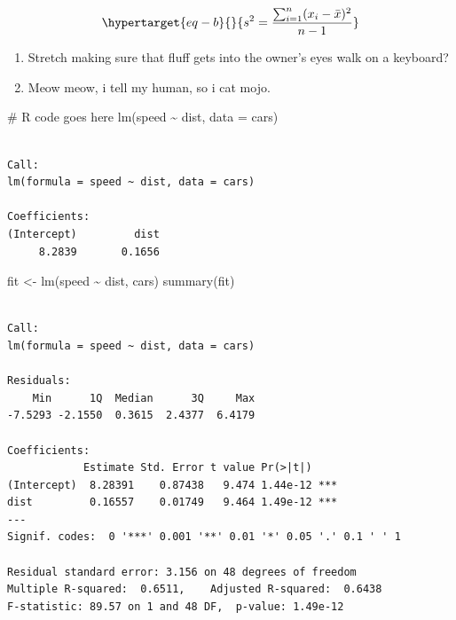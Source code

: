 \documentclass[
  11pt,
  letterpaper,
  DIV=11,
  numbers=noendperiod]{scrartcl}
\newenvironment{Shaded}{\begin{snugshade}}{\end{snugshade}}
\newcommand{\AttributeTok}[1]{\textcolor[rgb]{0.40,0.45,0.13}{#1}}
\newcommand{\CommentTok}[1]{\textcolor[rgb]{0.37,0.37,0.37}{#1}}
\newcommand{\FunctionTok}[1]{\textcolor[rgb]{0.28,0.35,0.67}{#1}}
\newcommand{\NormalTok}[1]{\textcolor[rgb]{0.00,0.23,0.31}{#1}}
\newcommand{\OtherTok}[1]{\textcolor[rgb]{0.00,0.23,0.31}{#1}}
\newcommand{\SpecialCharTok}[1]{\textcolor[rgb]{0.37,0.37,0.37}{#1}}
\providecommand{\tightlist}{%
  \setlength{\itemsep}{0pt}\setlength{\parskip}{0pt}}\usepackage{longtable,booktabs,array}
\begin{document}
\begin{equation}\protect\hypertarget{eq-b}{}{ s^2 = \frac{\sum_{i=1}^n (x_i - \bar{x})^2}{n-1} }\label{eq-b}\end{equation}

\begin{enumerate}
\def\labelenumi{\alph{enumi}.}
\tightlist
\item
  Stretch making sure that fluff gets into the owner's eyes walk on a
  keyboard?
\item
  Meow meow, i tell my human, so i cat mojo.
\end{enumerate}

\begin{Shaded}
\begin{Highlighting}[]
\CommentTok{\# R code goes here}
\FunctionTok{lm}\NormalTok{(speed }\SpecialCharTok{\textasciitilde{}}\NormalTok{ dist, }\AttributeTok{data =}\NormalTok{ cars)}
\end{Highlighting}
\end{Shaded}

\begin{verbatim}

Call:
lm(formula = speed ~ dist, data = cars)

Coefficients:
(Intercept)         dist  
     8.2839       0.1656  
\end{verbatim}

\begin{tcolorbox}[enhanced jigsaw, bottomrule=.15mm, toprule=.15mm, coltitle=black, leftrule=.75mm, opacitybacktitle=0.6, opacityback=0, bottomtitle=1mm, left=2mm, colbacktitle=quarto-callout-tip-color!10!white, titlerule=0mm, colback=white, colframe=quarto-callout-tip-color-frame, rightrule=.15mm, title=\textcolor{quarto-callout-tip-color}{\faLightbulb}\hspace{0.5em}{ANSWER}, breakable, arc=.35mm, toptitle=1mm]

\begin{Shaded}
\begin{Highlighting}[]
\NormalTok{fit }\OtherTok{\textless{}{-}} \FunctionTok{lm}\NormalTok{(speed }\SpecialCharTok{\textasciitilde{}}\NormalTok{ dist, cars)}
\FunctionTok{summary}\NormalTok{(fit)}
\end{Highlighting}
\end{Shaded}

\begin{verbatim}

Call:
lm(formula = speed ~ dist, data = cars)

Residuals:
    Min      1Q  Median      3Q     Max 
-7.5293 -2.1550  0.3615  2.4377  6.4179 

Coefficients:
            Estimate Std. Error t value Pr(>|t|)    
(Intercept)  8.28391    0.87438   9.474 1.44e-12 ***
dist         0.16557    0.01749   9.464 1.49e-12 ***
---
Signif. codes:  0 '***' 0.001 '**' 0.01 '*' 0.05 '.' 0.1 ' ' 1

Residual standard error: 3.156 on 48 degrees of freedom
Multiple R-squared:  0.6511,    Adjusted R-squared:  0.6438 
F-statistic: 89.57 on 1 and 48 DF,  p-value: 1.49e-12
\end{verbatim}

\end{tcolorbox}
\end{document}
